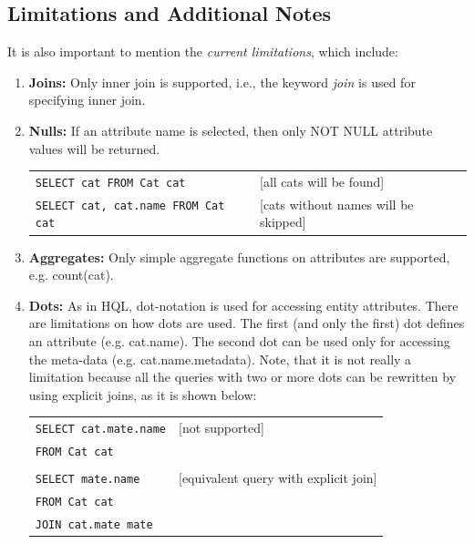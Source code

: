 \subsection{Limitations and Additional Notes}
It is also important to mention the \emph{current limitations}, which include:
\begin{enumerate}
\item \textbf{Joins:} Only inner join is supported, i.e., the keyword \emph{join} is used for specifying inner join.
\item \textbf{Nulls:} If an attribute name is selected, then only NOT NULL attribute values will be returned.

\begin{tabular}{ll}
\texttt{SELECT cat FROM Cat cat} & [all cats will be found] \\
\texttt{SELECT cat, cat.name FROM Cat cat} & [cats without names will be skipped] \\
\end{tabular}
\item \textbf{Aggregates:} Only simple aggregate functions on attributes are supported, e.g. count(cat).
\item \textbf{Dots:} As in HQL, dot-notation is used for accessing entity attributes. There are limitations on how dots are used. The first (and only the first) dot defines an attribute (e.g. cat.name). The second dot can be used only for accessing the meta-data (e.g. cat.name.metadata). Note, that it is not really a limitation because all the queries with two or more dots can be rewritten by using explicit joins, as it is shown below:

\begin{tabular}{p{}p{}}
\texttt{SELECT cat.mate.name} & [not supported] \\
\texttt{FROM Cat cat} & \\
 & \\
\texttt{SELECT mate.name}  & [equivalent query with explicit join] \\
\texttt{FROM Cat cat} & \\
\texttt{JOIN cat.mate mate} & \\
\end{tabular}
\end{enumerate}



